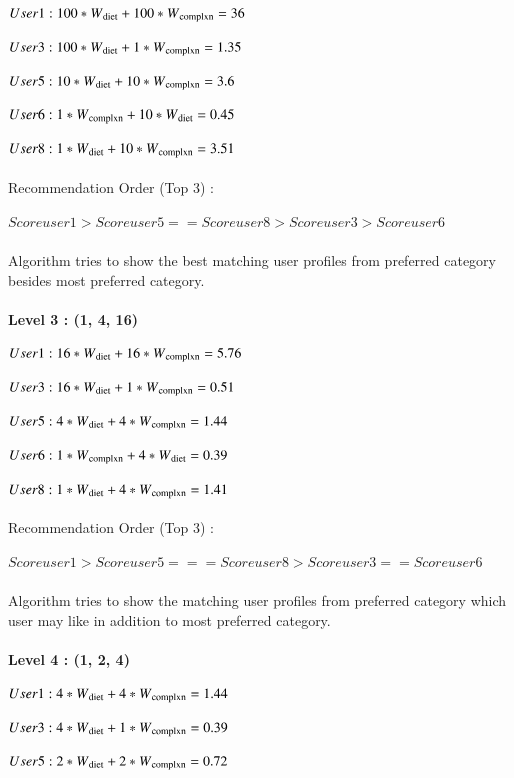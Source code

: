 \documentclass[12pt,oneside]{book}
\begin{document}
$User 1 :  100 * W\textsubscript{diet} + 100 * W\textsubscript{complxn} = 36$

$User 3 : 100 * W\textsubscript{diet} +  1 * W\textsubscript{complxn} = 1.35$

$User 5 : 10 * W\textsubscript{diet}  + 10 * W\textsubscript{complxn} = 3.6$

$User 6 : 1* W\textsubscript{complxn} + 10 * W\textsubscript{diet} = 0.45$

$User 8 : 1* W\textsubscript{diet} + 10 * W\textsubscript{complxn} = 3.51$\\\\
Recommendation Order (Top 3) :

$Scoreuser1 > Scoreuser5 == Scoreuser8 > Scoreuser3 > Scoreuser6$\\\\
Algorithm tries to show the best matching user profiles from preferred category besides most preferred category.\\\\
\textbf{Level 3 : (1, 4, 16)} 

$User 1 :  16 * W\textsubscript{diet} + 16 * W\textsubscript{complxn} = 5.76$

$User 3 : 16 * W\textsubscript{diet} +  1 * W\textsubscript{complxn} = 0.51$

$User 5 : 4 * W\textsubscript{diet}  + 4 * W\textsubscript{complxn} = 1.44$

$User 6 : 1* W\textsubscript{complxn} + 4 * W\textsubscript{diet} = 0.39$

$User 8 : 1* W\textsubscript{diet} + 4 * W\textsubscript{complxn} = 1.41$\\\\
Recommendation Order (Top 3) :  

$Scoreuser1 > Scoreuser5 ===Scoreuser8 > Scoreuser3 == Scoreuser6$\\\\
Algorithm tries to show the matching user profiles from preferred category which user may like in addition to  most preferred category.\\\\
\textbf{Level 4 : (1, 2, 4)} 

$User 1 :  4 * W\textsubscript{diet} + 4 * W\textsubscript{complxn} = 1.44$

$User 3 : 4 * W\textsubscript{diet} +  1 * W\textsubscript{complxn} = 0.39$

$User 5 : 2 * W\textsubscript{diet}  + 2 * W\textsubscript{complxn} = 0.72$
\end{document}
